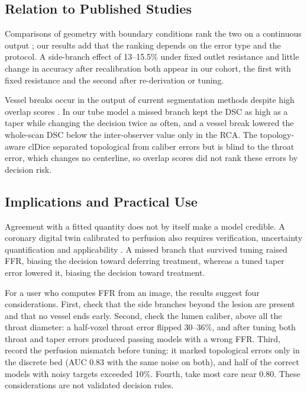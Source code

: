 \documentclass[journal,twoside,web]{ieeecolor}
\begin{document}
\subsection{Relation to Published Studies}
Comparisons of geometry with boundary conditions rank the two on a continuous output \cite{sankaran2016,tanade2022,korte2023};
our results add that the ranking depends on the error type and the protocol. A side-branch effect of 13--15.5\% under
fixed outlet resistance \cite{gamage2022} and little change in accuracy after recalibration \cite{gosling2020} both
appear in our cohort, the first with fixed resistance and the second after re-derivation or tuning.

Vessel breaks occur in the output of current segmentation methods despite high overlap scores \cite{bransby2026}.
In our tube model a missed branch kept the DSC as high as a taper while changing the decision twice as often, and a vessel break lowered the whole-scan DSC below the inter-observer value only in the RCA. The topology-aware clDice \cite{shit2021} separated topological from caliber errors but is blind to the throat error, which changes no centerline, so overlap scores did not rank these errors by decision risk.

\subsection{Implications and Practical Use}
Agreement with a fitted quantity does not by itself make a model credible. A coronary digital twin calibrated to perfusion also requires verification,
uncertainty quantification and applicability \cite{viceconti2025}. A missed branch that survived tuning raised FFR, biasing the decision toward
deferring treatment, whereas a tuned taper error lowered it, biasing the decision toward treatment.

For a user who computes FFR from an image, the results suggest four considerations. First, check that the side branches beyond the lesion are present and that no vessel ends early.
Second, check the lumen caliber, above all the throat diameter: a half-voxel throat error flipped 30--36\%, and after tuning both throat and taper errors produced passing models with a wrong FFR. Third, record the perfusion mismatch before tuning: it marked topological errors only in the discrete bed (AUC 0.83 with the same noise on both), and half of the correct models with noisy targets exceeded 10\%. Fourth, take most care near 0.80. These considerations are not validated decision rules.
\end{document}
